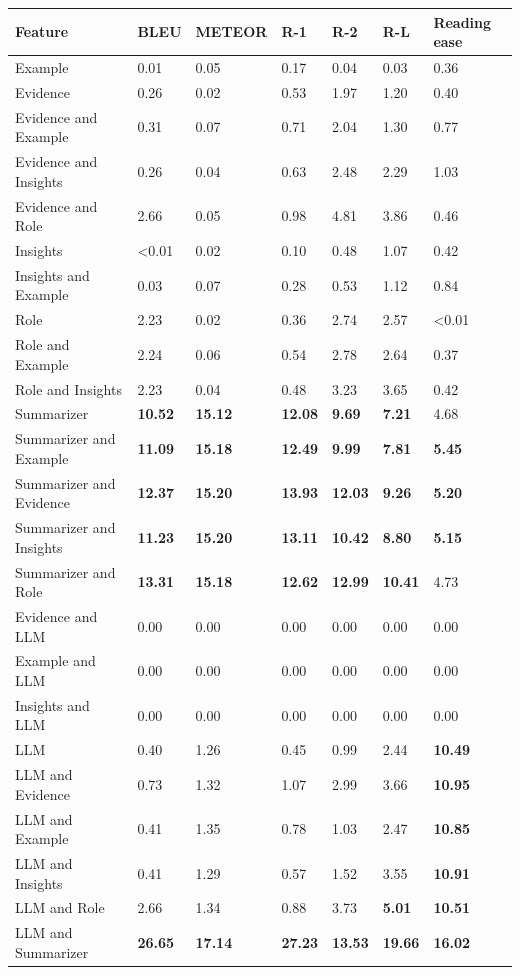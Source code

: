 \begin{tabular}{|l|l|l|l|l|l|l|}
\hline
\textbf{Feature} & BLEU & METEOR & R-1 & R-2 & R-L & Reading ease \\
 \hline
 Example & 0.01 & 0.05 & 0.17 & 0.04 & 0.03 & 0.36 \\
 \hline
 Evidence & 0.26 & 0.02 & 0.53 & 1.97 & 1.20 & 0.40 \\
 \hline
 Evidence and Example & 0.31 & 0.07 & 0.71 & 2.04 & 1.30 & 0.77 \\
 \hline
 Evidence and Insights & 0.26 & 0.04 & 0.63 & 2.48 & 2.29 & 1.03 \\
 \hline
 Evidence and Role & 2.66 & 0.05 & 0.98 & 4.81 & 3.86 & 0.46 \\
 \hline
 Insights & \textless{}0.01 & 0.02 & 0.10 & 0.48 & 1.07 & 0.42 \\
 \hline
 Insights and Example & 0.03 & 0.07 & 0.28 & 0.53 & 1.12 & 0.84 \\
 \hline
 Role & 2.23 & 0.02 & 0.36 & 2.74 & 2.57 & \textless{}0.01 \\
 \hline
 Role and Example & 2.24 & 0.06 & 0.54 & 2.78 & 2.64 & 0.37 \\
 \hline
 Role and Insights & 2.23 & 0.04 & 0.48 & 3.23 & 3.65 & 0.42 \\
 \hline
 Summarizer & \textbf{10.52} & \textbf{15.12} & \textbf{12.08} & \textbf{9.69} & \textbf{7.21} & 4.68 \\
 \hline
 Summarizer and Example & \textbf{11.09} & \textbf{15.18} & \textbf{12.49} & \textbf{9.99} & \textbf{7.81} & \textbf{5.45} \\
 \hline
 Summarizer and Evidence & \textbf{12.37} & \textbf{15.20} & \textbf{13.93} & \textbf{12.03} & \textbf{9.26} & \textbf{5.20} \\
 \hline
 Summarizer and Insights & \textbf{11.23} & \textbf{15.20} & \textbf{13.11} & \textbf{10.42} & \textbf{8.80} & \textbf{5.15} \\
 \hline
 Summarizer and Role & \textbf{13.31} & \textbf{15.18} & \textbf{12.62} & \textbf{12.99} & \textbf{10.41} & 4.73 \\
 \hline
 Evidence and LLM & 0.00 & 0.00 & 0.00 & 0.00 & 0.00 & 0.00 \\
 \hline
 Example and LLM & 0.00 & 0.00 & 0.00 & 0.00 & 0.00 & 0.00 \\
 \hline
 Insights and LLM & 0.00 & 0.00 & 0.00 & 0.00 & 0.00 & 0.00 \\
 \hline
 LLM & 0.40 & 1.26 & 0.45 & 0.99 & 2.44 & \textbf{10.49} \\
 \hline
 LLM and Evidence & 0.73 & 1.32 & 1.07 & 2.99 & 3.66 & \textbf{10.95} \\
 \hline
 LLM and Example & 0.41 & 1.35 & 0.78 & 1.03 & 2.47 & \textbf{10.85} \\
 \hline
 LLM and Insights & 0.41 & 1.29 & 0.57 & 1.52 & 3.55 & \textbf{10.91} \\
 \hline
 LLM and Role & 2.66 & 1.34 & 0.88 & 3.73 & \textbf{5.01} & \textbf{10.51} \\
 \hline
 LLM and Summarizer & \textbf{26.65} & \textbf{17.14} & \textbf{27.23} & \textbf{13.53} & \textbf{19.66} & \textbf{16.02} \\
\hline
\end{tabular}
